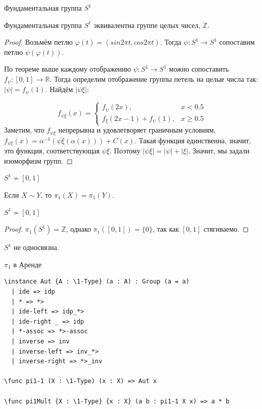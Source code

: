 \documentclass[aspectratio=169,dvipsnames,usenames]{beamer}
\begin{document}
\begin{frame}{Фундаментальная группа $S^1$}
\begin{thm}
Фундаментальная группа $S^1$ эквивалентна группе целых чисел, $\mathbb{Z}$.
\end{thm}
\begin{proof}
Возьмём петлю $\varphi(t) = (sin 2\pi t, cos 2\pi t)$. Тогда $\psi: S^1 \rightarrow S^1$ 
сопоставим петлю $\psi(\varphi(t))$. 

По теореме выше каждому отображению $\psi: S^1 \rightarrow S^1$ можно сопоставить $f_\psi: [0,1] \rightarrow \mathbb{R}$.
Тогда определим отображение группы петель на целые числа так: $|\psi| = f_\psi(1)$. Найдём $|\psi\xi|$:

$$f_{\psi\xi}(x) = 
\left\{
\begin{array}{ll}f_\psi(2x),& x < 0.5
\\ f_\xi(2x-1) + f_\psi(1),& x \ge 0.5
\end{array}
\right.$$
Заметим, что $f_{\psi\xi}$ непрерывна и удовлетворяет граничным условиям, $f_{\psi\xi}(x) = \alpha^{-1}(\psi\xi(\alpha(x))) + C(x)$.
Такая функция единственна, значит, это функция, соответствующая $\psi\xi$. Поэтому $|\psi\xi| = |\psi|+|\xi|$.
Значит, мы задали изоморфизм групп.
\end{proof}
\end{frame}

\begin{frame}{$S^1 \not\sim [0,1]$}
\begin{thm}Если $X \sim Y$, то $\pi_1(X) = \pi_1(Y)$.
\end{thm}

\begin{thm}$S^1 \not\sim [0,1]$\end{thm}
\begin{proof}$\pi_1(S^1) = \mathbb{Z}$, однако $\pi_1([0,1]) = \{0\}$, так как $[0,1]$ стягиваемо.
\end{proof}

\begin{thm}$S^1$ не односвязна.\end{thm}
\end{frame}

\begin{frame}[fragile]{$\pi_1$ в Аренде}
\begin{verbatim}
\instance Aut {A : \1-Type} (a : A) : Group (a = a)
  | ide => idp
  | * => *>
  | ide-left => idp_*>
  | ide-right _ => idp
  | *-assoc => *>-assoc
  | inverse => inv
  | inverse-left => inv_*>
  | inverse-right => *>_inv

\func pi1-1 (X : \1-Type) (x : X) => Aut x

\func pi1Mult {X : \1-Type} {x : X} (a b : pi1-1 X x) => a * b
\end{verbatim}
\end{frame}
\end{document}
